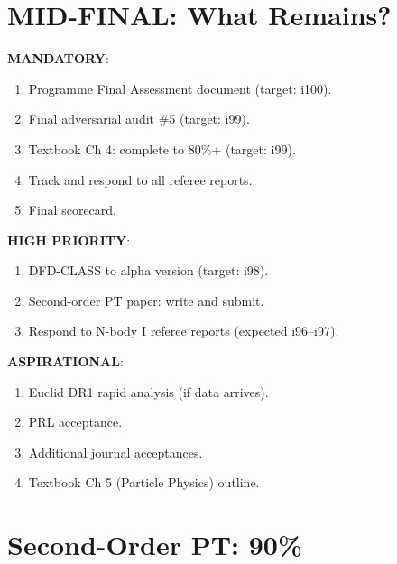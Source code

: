 \documentclass[11pt,a4paper]{article}
\begin{document}
\section{MID-FINAL: What Remains?}

\begin{tcolorbox}[colback=blue!5!white, colframe=dfdblue, title=\textbf{Remaining Deliverables: i96--i100}]

\textbf{MANDATORY}:
\begin{enumerate}[nosep]
\item Programme Final Assessment document (target: i100).
\item Final adversarial audit \#5 (target: i99).
\item Textbook Ch 4: complete to 80\%+ (target: i99).
\item Track and respond to all referee reports.
\item Final scorecard.
\end{enumerate}

\textbf{HIGH PRIORITY}:
\begin{enumerate}[nosep]
\item DFD-CLASS to alpha version (target: i98).
\item Second-order PT paper: write and submit.
\item Respond to N-body I referee reports (expected i96--i97).
\end{enumerate}

\textbf{ASPIRATIONAL}:
\begin{enumerate}[nosep]
\item Euclid DR1 rapid analysis (if data arrives).
\item PRL acceptance.
\item Additional journal acceptances.
\item Textbook Ch 5 (Particle Physics) outline.
\end{enumerate}
\end{tcolorbox}

\section{Second-Order PT: 90\%}
\end{document}
